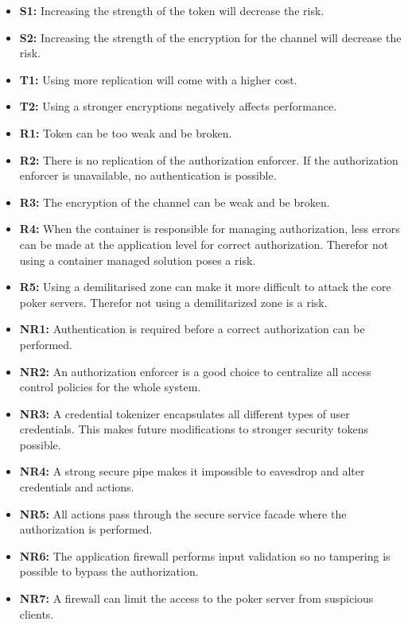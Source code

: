 \documentclass[a4paper,11pt]{report}
\begin{document}
\begin{itemize}
\item \textbf{S1:} Increasing the strength of the token will decrease the risk.
\item \textbf{S2:} Increasing the strength of the encryption for the channel will decrease the risk.
\item \textbf{T1:} Using more replication will come with a higher cost.
\item \textbf{T2:} Using a stronger encryptions negatively affects performance.
\item \textbf{R1:} Token can be too weak and be broken.
\item \textbf{R2:} There is no replication of the authorization enforcer. If the authorization enforcer is unavailable, no authentication is possible.
\item \textbf{R3:} The encryption of the channel can be weak and be broken.
\item \textbf{R4:} When the container is responsible for managing authorization, less errors can be made at the application level for correct authorization. Therefor not using a container managed solution poses a risk.
\item \textbf{R5:} Using a demilitarised zone can make it more difficult to attack the core poker servers. Therefor not using a demilitarized zone is a risk.
\item \textbf{NR1:} Authentication is required before a correct authorization can be performed.
\item \textbf{NR2:} An authorization enforcer is a good choice to centralize all access control policies for the whole system.
\item \textbf{NR3:} A credential tokenizer encapsulates all different types of user credentials. This makes future modifications to stronger security tokens possible.
\item \textbf{NR4:} A strong secure pipe makes it impossible to eavesdrop and alter credentials and actions.
\item \textbf{NR5:} All actions pass through the secure service facade where the authorization is performed.
\item \textbf{NR6:} The application firewall performs input validation so no tampering is possible to bypass the authorization.
\item \textbf{NR7:} A firewall can limit the access to the poker server from suspicious clients.
\end{itemize}
\end{document}
